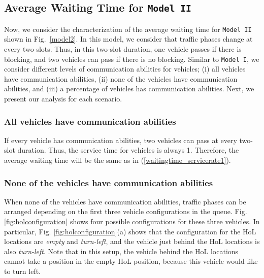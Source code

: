 \documentclass[conference]{IEEEtran}
\newcommand{\modelI}{{\tt{Model I}}}
\newcommand{\modelII}{{\tt{Model II}}}
\begin{document}
\vspace{-5pt}
\subsection{Average Waiting Time for \modelII}
Now, we consider the characterization of the average waiting time for \modelII~ shown in Fig.~\ref{model2}. In this model, we consider that traffic phases change at every two slots. Thus, in this two-slot duration, one vehicle passes if there is blocking, and two vehicles can pass if there is no blocking. Similar to \modelI, we consider different levels of communication abilities for vehicles; (i) all vehicles have communication abilities, (ii) none of the vehicles have communication abilities, and (iii) a percentage of vehicles has communication abilities. Next, we present our analysis for each scenario.

\subsubsection{All vehicles have communication abilities}\label{everycartellsmodel2}
If every vehicle has communication abilities, two vehicles can pass at every two-slot duration. Thus, the service time for vehicles is always 1. Therefore, the average waiting time will be the same as in (\ref{waitingtime_servicerate1}).

\subsubsection{None of the vehicles have communication abilities}\label{nocarscantellmodel2}
When none of the vehicles have communication abilities, traffic phases can be arranged depending on the first three vehicle configurations in the queue. Fig. \ref{fig:holconfiguration} shows four possible configurations for these three vehicles. In particular, Fig. \ref{fig:holconfiguration}(a) shows that the configuration for the HoL locations are {\em empty} and {\em turn-left}, and the vehicle just behind the HoL locations is also {\em turn-left}. Note that in this setup, the vehicle behind the HoL locations cannot take a position in the empty HoL position, because this vehicle would like to turn left.
\end{document}
